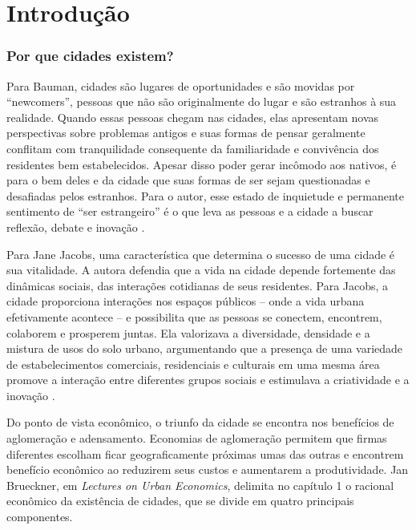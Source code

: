 \chapter{Introdução}

\subsection*{\textbf{Por que cidades existem?}}

Para Bauman, cidades são lugares de oportunidades e são movidas por ``newcomers'', pessoas que não são originalmente do lugar e são estranhos à sua realidade. Quando essas pessoas chegam nas cidades, elas apresentam novas perspectivas sobre problemas antigos e suas formas de pensar geralmente conflitam com tranquilidade consequente da familiaridade e convivência dos residentes bem estabelecidos. Apesar disso poder gerar incômodo aos nativos, é para o bem deles e da cidade que suas formas de ser sejam questionadas e desafiadas pelos estranhos. Para o autor, esse estado de inquietude e permanente sentimento de ``ser estrangeiro'' é o que leva as pessoas e a cidade a buscar reflexão, debate e inovação \cite{bauman2003city}.

Para Jane Jacobs, uma característica que determina o sucesso de uma cidade é sua vitalidade. A autora defendia que a vida na cidade depende fortemente das dinâmicas sociais, das interações cotidianas de seus residentes. Para Jacobs, a cidade proporciona interações nos espaços públicos -- onde a vida urbana efetivamente acontece -- e possibilita que as pessoas se conectem, encontrem, colaborem e prosperem juntas. Ela valorizava a diversidade, densidade e a mistura de usos do solo urbano, argumentando que a presença de uma variedade de estabelecimentos comerciais, residenciais e culturais em uma mesma área promove a interação entre diferentes grupos sociais e estimulava a criatividade e a inovação \cite{jacobs1961death}.

Do ponto de vista econômico, o triunfo da cidade se encontra nos benefícios de aglomeração e adensamento. Economias de aglomeração permitem que firmas diferentes escolham ficar geograficamente próximas umas das outras e encontrem benefício econômico ao reduzirem seus custos e aumentarem a produtividade. Jan Brueckner, em \textit{Lectures on Urban Economics}, delimita no capítulo 1 o racional econômico da existência de cidades, que se divide em quatro principais componentes.

